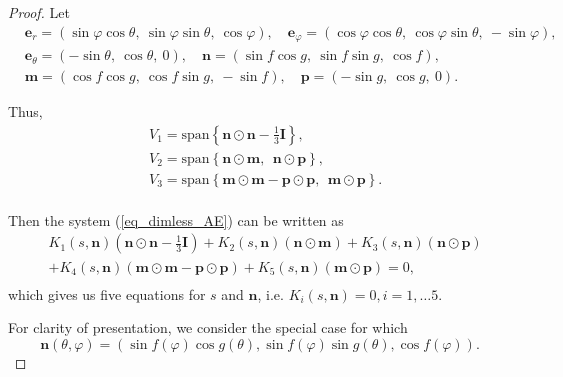 \documentclass[10pt, a4paper]{article}
\newcommand\n{\mathbf{n}}
\newcommand\m{\mathbf{m}}
\newcommand\p{\mathbf{p}}
\begin{document}
\begin{proof}


Let
\begin{equation}
  \begin{aligned}
    & \mathbf{e}_r = \left( \sin \varphi \cos \theta,~ \sin \varphi \sin \theta,~ \cos \varphi \right), \quad \mathbf{e}_{\varphi} = \left( \cos \varphi \cos \theta,~ \cos \varphi \sin \theta,~ - \sin \varphi \right), \\
    &  \mathbf{e}_{\theta} = \left( - \sin \theta,~ \cos \theta,~ 0 \right), \quad \n = \left( \sin f  \cos g, ~ \sin f   \sin g,~ \cos f \right), \\
    &  \m = \left( \cos f \cos g,~ \cos f \sin g,~ - \sin f \right), \quad \p = \left( - \sin g,~ \cos g,~ 0 \right).
  \end{aligned}
\end{equation}

Thus,
\begin{equation}
\begin{aligned}
& V_1 = \mathrm{span} \left\{ \n \odot \n - \frac{1}{3} \mathbf{I} \right\}, \\
& V_2 = \mathrm{span} \left\{ \n \odot \m, ~~  \n \odot \p \right\}, \\
& V_3 = \mathrm{span} \left\{ \m \odot  \m - \p \odot \p, ~~ \m \odot \p \right \}. \\
\end{aligned}
\end{equation}

Then the system (\ref{eq_dimless_AE}) can be written as
\begin{equation}
\begin{aligned}
& K_1 (s, \n) \left( \n \odot \n - \frac{1}{3} \mathbf{I} \right) +  K_2 (s, \n) \left( \n \odot \m \right) + K_3 (s, \n) \left( \n \odot \p \right)  \\
& + K_4 (s, \n) \left( \m \odot  \m - \p \odot \p \right) + K_5 (s, \n) \left( \m \odot \p \right) = 0, \\
\end{aligned}
\end{equation}
which gives us five equations for $s$ and $\n$, i.e. $K_i (s, \n) = 0,  i = 1, \ldots 5$.

For clarity of presentation, we consider the special case for which
\begin{equation}\label{AE_n_sp}
    \n(\theta, \varphi) = (\sin f(\varphi) \cos g (\theta), \sin f(\varphi) \sin g(\theta),  \cos f(\varphi) ). 
\end{equation}


\end{proof}
\end{document}
